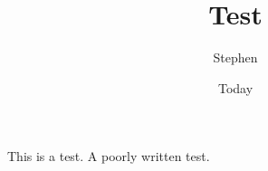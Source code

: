 \documentclass{article}
\title{Test}
\author{Stephen}
\date{Today}
\begin{document}
This is a test.  A poorly written test.


\end{document}
